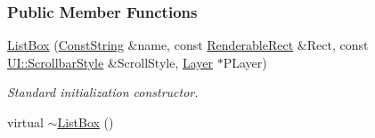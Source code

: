 \subsubsection*{Public Member Functions}
\begin{DoxyCompactItemize}
\item 
\hyperlink{classMezzanine_1_1UI_1_1ListBox_a60130f372bc78fbb20f28270bbed8cf2}{ListBox} (\hyperlink{namespaceMezzanine_a63cd699ac54b73953f35ec9cfc05e506}{ConstString} \&name, const \hyperlink{structMezzanine_1_1UI_1_1RenderableRect}{RenderableRect} \&Rect, const \hyperlink{namespaceMezzanine_1_1UI_a5998a9bf372a7e92605c0c461736e763}{UI::ScrollbarStyle} \&ScrollStyle, \hyperlink{classMezzanine_1_1UI_1_1Layer}{Layer} $\ast$PLayer)
\begin{DoxyCompactList}\small\item\em Standard initialization constructor. \item\end{DoxyCompactList}\item 
\hypertarget{classMezzanine_1_1UI_1_1ListBox_a1fa312d9bc349a7a3b254afde3de81bd}{
virtual \hyperlink{classMezzanine_1_1UI_1_1ListBox_a1fa312d9bc349a7a3b254afde3de81bd}{$\sim$ListBox} ()}
\label{classMezzanine_1_1UI_1_1ListBox_a1fa312d9bc349a7a3b254afde3de81bd}


\end{DoxyCompactItemize}
